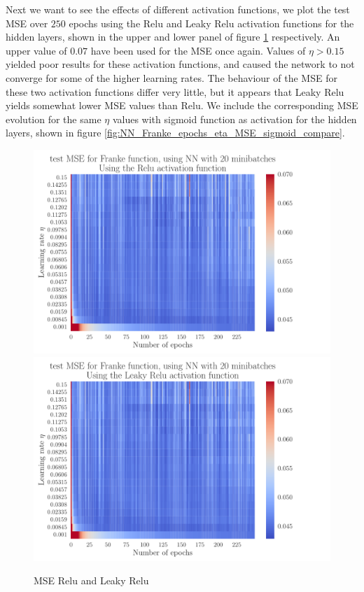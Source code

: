 \documentclass[12pt]{extarticle}
\begin{document}
Next we want to see the effects of different activation functions, we plot the test MSE over $250$ epochs using the Relu and Leaky Relu activation functions for the hidden layers, shown in the upper and lower panel of figure \ref{fig:NN_Franke_epochs_eta_MSE_relu_leaky} respectively. An upper value of $0.07$ have been used for the MSE once again. Values of $\eta>0.15$ yielded poor results for these activation functions, and caused the network to not converge for some of the higher learning rates. The behaviour of the MSE for these two activation functions differ very little, but it appears that Leaky Relu yields somewhat lower MSE values than Relu. We include the corresponding MSE evolution for the same $\eta$ values with sigmoid function as activation for the hidden layers, shown in figure \ref{fig:NN_Franke_epochs_eta_MSE_sigmoid_compare}.

\begin{figure}[h!]
	\includegraphics[width=0.8\linewidth]{NN_Franke/NN_Franke__epochs_eta__test_MSE__relu__733938.pdf}
	\includegraphics[width=0.8\linewidth]{NN_Franke/NN_Franke__epochs_eta__test_MSE__leaky_relu__501404.pdf}
	\caption{MSE Relu and Leaky Relu}
	\label{fig:NN_Franke_epochs_eta_MSE_relu_leaky}
\end{figure}
\end{document}
